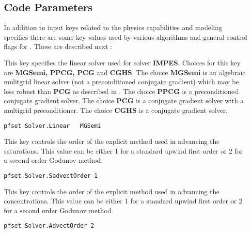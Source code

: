
\subsection{Code Parameters}
\label{Code Parameters}

In addition to input keys related to the physics capabilities
and modeling specifics there are some key values used by various
algorithms and general control flags for \parflow{}.  These
are described next :

{This key specifies the linear solver used for solver {\bf IMPES}.  Choices for this key are {\bf MGSemi, PPCG, PCG} and {\bf   CGHS}.  The choice
{\bf MGSemi} is an algebraic mulitgrid linear solver (not a preconditioned conjugate gradient) which may be less robust than {\bf PCG} as described in \cite{Ashby-Falgout90}.  The choice {\bf PPCG} is a preconditioned conjugate gradient solver.
The choice {\bf PCG} is a conjugate gradient solver with a multigrid preconditioner.  The choice {\bf CGHS} is a conjugate gradient solver.
}
\begin{display}\begin{verbatim}
pfset Solver.Linear   MGSemi
\end{verbatim}\end{display}

{
This key controls the order of the explicit method used in
advancing the saturations.  This value can be either 1 for
a standard upwind first order or 2 for a second order
Godunov method.
}
\begin{display}\begin{verbatim}
pfset Solver.SadvectOrder 1
\end{verbatim}\end{display}

{
This key controls the order of the explicit method used in
advancing the concentrations.  This value can be either 1 for
a standard upwind first order or 2 for a second order
Godunov method.
}
\begin{display}\begin{verbatim}
pfset Solver.AdvectOrder 2
\end{verbatim}\end{display}

